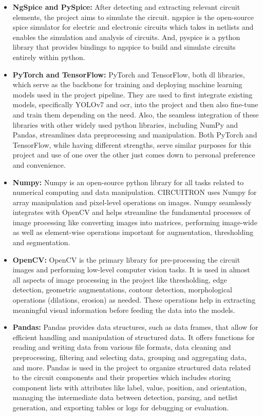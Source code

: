 \begin{itemize}
    \item \textbf{NgSpice and PySpice:} After detecting and extracting relevant circuit elements, the project aims to simulate the circuit. \gls{ngspice} is the open-source \gls{spice} simulator for electric and electronic circuits which takes in netlists and enables the simulation and analysis of circuits. And, \gls{pyspice} is a \gls{python} library that provides bindings to \gls{ngspice} to build and simulate circuits entirely within \gls{python}.
    
    \item \textbf{PyTorch and TensorFlow:} PyTorch and TensorFlow, both \gls{dl} libraries, which serve as the backbone for training and deploying machine learning models used in the project pipeline. They are used to first integrate existing models, specifically YOLOv7 and \gls{ocr}, into the project and then also fine-tune and train them depending on the need. Also, the seamless integration of these libraries with other widely used \gls{python} libraries, including NumPy and Pandas, streamlines data preprocessing and manipulation. Both PyTorch and TensorFlow, while having different strengths, serve similar purposes for this project and use of one over the other just comes down to personal preference and convenience.
    
    \item \textbf{Numpy:} Numpy is an open-source \gls{python} library for all tasks related to numerical computing and data manipulation. CIRCUITRON uses Numpy for array manipulation and pixel-level operations on images. Numpy seamlessly integrates with OpenCV and helps streamline the fundamental processes of image processing like converting images into matrices, performing image-wide as well as element-wise operations important for augmentation, thresholding and segmentation.
    
    \item \textbf{OpenCV:} OpenCV is the primary library for pre-processing the circuit images and performing low-level computer vision tasks. It is used in almost all aspects of image processing in the project like thresholding, edge detection, geometric augmentations, contour detection, morphological operations (dilations, erosion) as needed. These operations help in extracting meaningful visual information before feeding the data into the models.
    
    \item \textbf{Pandas:} Pandas provides data structures, such as data frames, that allow for efficient handling and manipulation of structured data. It offers functions for reading and writing data from various file formats, data cleaning and preprocessing, filtering and selecting data, grouping and aggregating data, and more. Pandas is used in the project to organize structured data related to the circuit components and their properties which includes storing component lists with attributes like label, value, position, and orientation, managing the intermediate data between detection, parsing, and netlist generation, and exporting tables or logs for debugging or evaluation.
    

\end{itemize}
